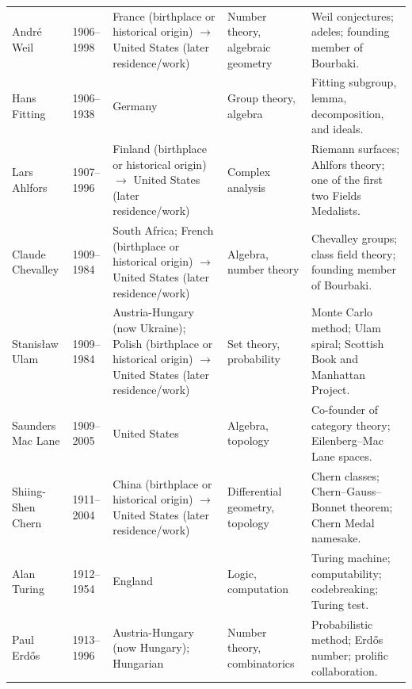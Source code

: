 {\begin{longtable}{@{}L{0.145\textwidth}L{0.09\textwidth}L{0.225\textwidth}L{0.14\textwidth}L{0.30\textwidth}@{}}
        André Weil
        & 1906--1998
        & France (birthplace or historical origin) \(\to\) United States (later residence/work)
        & Number theory, algebraic geometry
        & Weil conjectures; adeles; founding member of Bourbaki. \\

        Hans Fitting
        & 1906--1938
        & Germany
        & Group theory, algebra
        & Fitting subgroup, lemma, decomposition, and ideals. \\

        Lars Ahlfors
        & 1907--1996
        & Finland (birthplace or historical origin) \(\to\) United States (later residence/work)
        & Complex analysis
        & Riemann surfaces; Ahlfors theory; one of the first two Fields
          Medalists. \\

        Claude Chevalley
        & 1909--1984
        & South Africa; French (birthplace or historical origin) \(\to\) United States (later residence/work)
        & Algebra, number theory
        & Chevalley groups; class field theory; founding member of Bourbaki. \\

        Stanisław Ulam
        & 1909--1984
        & Austria-Hungary (now Ukraine); Polish (birthplace or historical origin) \(\to\) United States (later residence/work)
        & Set theory, probability
        & Monte Carlo method; Ulam spiral; Scottish Book and Manhattan Project. \\

        Saunders Mac Lane
        & 1909--2005
        & United States
        & Algebra, topology
        & Co-founder of category theory; Eilenberg--Mac Lane spaces. \\

        Shiing-Shen Chern
        & 1911--2004
        & China (birthplace or historical origin) \(\to\) United States (later residence/work)
        & Differential geometry, topology
        & Chern classes; Chern--Gauss--Bonnet theorem; Chern Medal namesake. \\

        Alan Turing
        & 1912--1954
        & England
        & Logic, computation
        & Turing machine; computability; codebreaking; Turing test. \\

        Paul Erd\H{o}s
        & 1913--1996
        & Austria-Hungary (now Hungary); Hungarian
        & Number theory, combinatorics
        & Probabilistic method; Erd\H{o}s number; prolific collaboration. \\


\end{longtable}}
